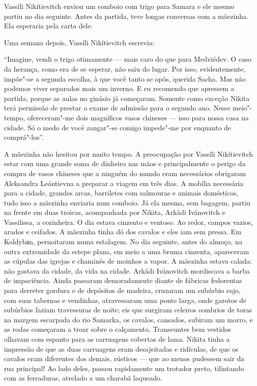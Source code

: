 Vassíli Nikítievitch enviou um comboio com trigo para Samara e ele mesmo
partiu no dia seguinte. Antes da partida, teve longas conversas com a
mãezinha. Ela esperaria pela carta dele.

Uma semana depois, Vassíli Nikítievitch escrevia:

``Imagine, vendi o trigo otimamente --- mais caro do que para Medviédev.
O caso da herança, como era de se esperar, não saiu do lugar. Por isso,
evidentemente, impõe"-se a segunda escolha, à que você tanto se opôs,
querida Sacha. Mas não podemos viver separados mais um inverno. E eu
recomendo que apressem a partida, porque as aulas no ginásio já
começaram. Somente como exceção Nikita terá permissão de prestar o exame
de admissão para o segundo ano. Nesse meio"-tempo, ofereceram"-me dois
magníficos vasos chineses --- isso para nossa casa na cidade. Só
o medo de você zangar"-se comigo impede"-me por enquanto de comprá"-los''.

A mãezinha não hesitou por muito tempo. A preocupação por Vassíli
Nikítievitch estar com uma grande soma de dinheiro nas mãos e
principalmente o perigo da compra de vasos chineses que a ninguém do
mundo eram necessários obrigaram Aleksandra Leóntievna a preparar a
viagem em três dias. A mobília necessária para a cidade, grandes arcas,
barriletes com salmouras e animais domésticos, tudo isso a mãezinha
enviaria num comboio. Já ela mesma, sem bagagem, partiu na frente em
duas troicas, acompanhada por Nikita, Arkádi Ivánovitch e Vassilissa, a
cozinheira. O dia estava cinzento e ventoso. Ao redor, campos vazios,
arados e ceifados. A mãezinha tinha dó dos cavalos e eles iam sem
pressa. Em Koldybаn, pernoitaram numa estalagem. No dia seguinte, antes
do almoço, na outra extremidade da estepe plana, em meio a uma bruma
cinzenta, apareceram as cúpulas das igrejas e chaminés de moinhos a
vapor. A mãezinha estava calada: não gostava da cidade, da vida na
cidade. Arkádi Ivánovitch mordiscava a barba de impaciência. Ainda
passaram demoradamente diante de fábricas fedorentas para derreter
gordura e de depósitos de madeira, cruzaram um subúrbio sujo, com
suas tabernas e vendinhas, atravessaram uma ponte larga, onde garotos de
subúrbios faziam travessuras de noite; eis que surgiram celeiros sombrios de
toras na margem escarpada do rio Samarka, os cavalos, cansados,
subiram um morro, e as rodas começaram a troar sobre o calçamento.
Transeuntes bem vestidos olhavam com espanto para as carruagens cobertas
de lama. Nikita tinha a impressão de que as duas carruagens eram
desajeitadas e ridículas, de que os cavalos eram diferentes dos demais,
rústicos --- que ao menos pudessem sair da rua principal! Ao lado deles,
passou rapidamente um trotador preto, tilintando com as ferraduras,
atrelado a um charabã laqueado.

